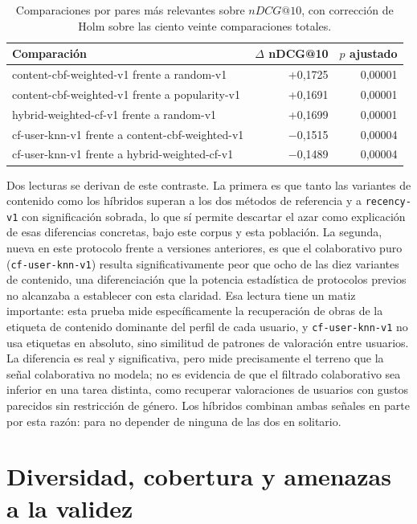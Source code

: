 \begin{table}[H]
\centering
\caption{Comparaciones por pares más relevantes sobre \(nDCG@10\), con corrección de Holm
sobre las ciento veinte comparaciones totales.}\label{tab:significacion}
\small
\begin{tabularx}{\textwidth}{@{}Yrr@{}}
\textnormal{Comparación} & \textnormal{\(\Delta\) nDCG@10} & \textnormal{\(p\) ajustado} \\
\hline
content-cbf-weighted-v1 frente a random-v1 & +0{,}1725 & 0{,}00001 \\
content-cbf-weighted-v1 frente a popularity-v1 & +0{,}1691 & 0{,}00001 \\
hybrid-weighted-cf-v1 frente a random-v1 & +0{,}1699 & 0{,}00001 \\
cf-user-knn-v1 frente a content-cbf-weighted-v1 & \(-\)0{,}1515 & 0{,}00004 \\
cf-user-knn-v1 frente a hybrid-weighted-cf-v1 & \(-\)0{,}1489 & 0{,}00004 \\
\end{tabularx}
\end{table}

Dos lecturas se derivan de este contraste. La primera es que tanto las variantes de contenido
como los híbridos superan a los dos métodos de referencia y a \texttt{recency-v1} con significación
sobrada, lo que sí permite descartar el azar como explicación de esas diferencias concretas,
bajo este corpus y esta población. La segunda, nueva en este protocolo frente a versiones
anteriores, es que el colaborativo puro (\texttt{cf-user-knn-v1}) resulta significativamente
peor que ocho de las diez variantes de contenido, una diferenciación que la potencia
estadística de protocolos previos no alcanzaba a establecer con esta claridad. Esa lectura
tiene un matiz importante: esta prueba mide específicamente la recuperación de obras de la
etiqueta de contenido dominante del perfil de cada usuario, y \texttt{cf-user-knn-v1} no usa
etiquetas en absoluto, sino similitud de patrones de valoración entre usuarios. La diferencia
es real y significativa, pero mide precisamente el terreno que la señal colaborativa no
modela; no es evidencia de que el filtrado colaborativo sea inferior en una tarea distinta,
como recuperar valoraciones de usuarios con gustos parecidos sin restricción de género. Los
híbridos combinan ambas señales en parte por esta razón: para no depender de ninguna de las
dos en solitario.

\section{Diversidad, cobertura y amenazas a la validez}\label{sec:exp-amenazas}

